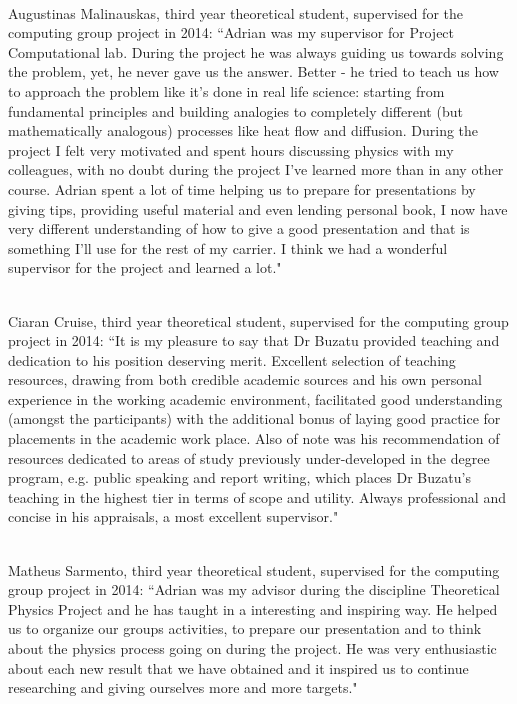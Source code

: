 \documentclass[12pt]{article} %
\begin{document}
\begin{appendices}

\ \\Augustinas Malinauskas, third year theoretical student, supervised for the computing group project in 2014: ``Adrian was my supervisor for Project Computational lab. During the project he was always guiding us towards solving the problem, yet, he never gave us the answer. Better - he tried to teach us how to approach the problem like it's done in real life science: starting from fundamental principles and building analogies to completely different (but mathematically analogous) processes like heat flow and diffusion. During the project I felt very motivated and spent hours discussing physics with my colleagues, with no doubt during the project I've learned more than in any other course. Adrian spent a lot of time helping us to prepare for presentations by giving tips, providing useful material and even lending personal book, I now have very different understanding of how to give a good presentation and that is something I'll use for the rest of my carrier. I think we had a wonderful supervisor for the project and learned a lot."

\ \\Ciaran Cruise, third year theoretical student, supervised for the computing group project in 2014: ``It is my pleasure to say that Dr Buzatu provided teaching and dedication to his position deserving
merit. Excellent selection of teaching resources, drawing from both credible academic sources and his
own personal experience in the working academic environment, facilitated good understanding
(amongst the participants) with the additional bonus of laying good practice for placements in
the academic work place. Also of note was his recommendation of resources dedicated to areas of study
previously under-developed in the degree program, e.g. public speaking and report writing, which places Dr Buzatu's teaching in the highest tier in terms of scope and utility. Always professional and concise in his appraisals, a most excellent supervisor." 

\ \\Matheus Sarmento, third year theoretical student, supervised for the computing group project in 2014: ``Adrian was my advisor during the discipline Theoretical Physics Project and he has taught in a interesting and inspiring way. He helped us to organize our groups activities, to prepare our presentation and to think about the physics process going on during the project. He was very enthusiastic about each new result that we have obtained and it inspired us to continue researching and giving ourselves more and more targets."


\end{appendices}
\end{document}
